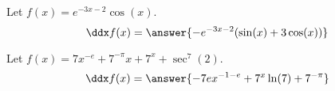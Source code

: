 \documentclass{ximera}
\begin{document}
\begin{shuffle}
\begin{exercise}
Let $f(x)=e^{-3 x-2} \cos (x)$.
\[
\ddx f(x) = \answer{-e^{-3 x-2} (\sin (x)+3 \cos (x))}
\]
\end{exercise}



\begin{exercise}
Let $f(x)=7 x^{-e}+7^{-\pi } x+7^x+\sec ^7(2)$.
\[
\ddx f(x) = \answer{-7 e x^{-1-e}+7^x \ln (7)+7^{-\pi }}
\]
\end{exercise}

  
\end{shuffle}
\end{document}
